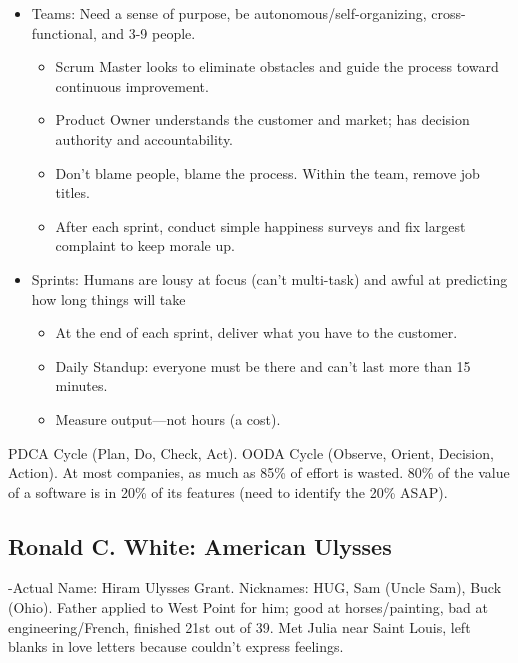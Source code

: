 \documentclass[
]{article}
\begin{document}
\begin{itemize}
\item
  Teams: Need a sense of purpose, be autonomous/self-organizing,
  cross-functional, and 3-9 people.

  \begin{itemize}
  \item
    Scrum Master looks to eliminate obstacles and guide the process
    toward continuous improvement.
  \item
    Product Owner understands the customer and market; has decision
    authority and accountability.
  \item
    Don't blame people, blame the process. Within the team, remove job
    titles.
  \item
    After each sprint, conduct simple happiness surveys and fix largest
    complaint to keep morale up.
  \end{itemize}
\item
  Sprints: Humans are lousy at focus (can't multi-task) and awful at
  predicting how long things will take

  \begin{itemize}
  \item
    At the end of each sprint, deliver what you have to the customer.
  \item
    Daily Standup: everyone must be there and can't last more than 15
    minutes.
  \item
    Measure output---not hours (a cost).
  \end{itemize}
\end{itemize}

PDCA Cycle (Plan, Do, Check, Act). OODA Cycle (Observe, Orient,
Decision, Action). At most companies, as much as 85\% of effort is
wasted. 80\% of the value of a software is in 20\% of its features (need
to identify the 20\% ASAP).

\hypertarget{ronald-c.-white-american-ulysses}{%
\subsection{Ronald C. White: American
Ulysses}\label{ronald-c.-white-american-ulysses}}

-Actual Name: Hiram Ulysses Grant. Nicknames: HUG, Sam (Uncle Sam), Buck
(Ohio). Father applied to West Point for him; good at horses/painting,
bad at engineering/French, finished 21st out of 39. Met Julia near Saint
Louis, left blanks in love letters because couldn't express feelings.
\end{document}
